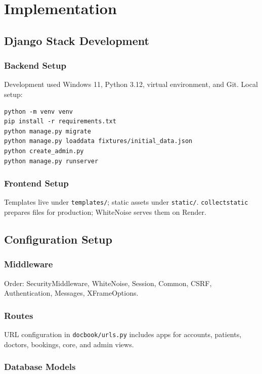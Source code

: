 \chapter{Implementation}

\section{Django Stack Development}

\subsection{Backend Setup}

Development used Windows 11, Python 3.12, virtual environment, and Git. Local setup:

\begin{verbatim}
python -m venv venv
pip install -r requirements.txt
python manage.py migrate
python manage.py loaddata fixtures/initial_data.json
python create_admin.py
python manage.py runserver
\end{verbatim}

\subsection{Frontend Setup}

Templates live under \texttt{templates/}; static assets under \texttt{static/}. \texttt{collectstatic} prepares files for production; WhiteNoise serves them on Render.

\section{Configuration Setup}

\subsection{Middleware}

Order: SecurityMiddleware, WhiteNoise, Session, Common, CSRF, Authentication, Messages, XFrameOptions.

\subsection{Routes}

URL configuration in \texttt{docbook/urls.py} includes apps for accounts, patients, doctors, bookings, core, and admin views.

\subsection{Database Models}

